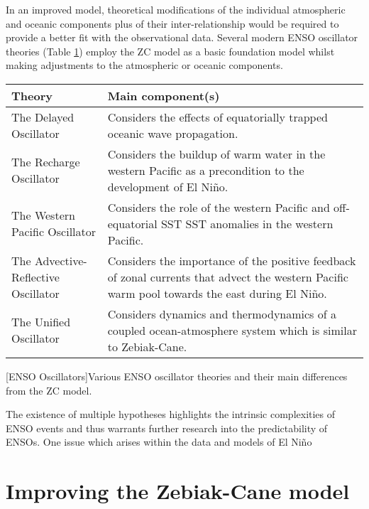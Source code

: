 \documentclass[12pt, onecolumn]{revtex4}    %
\begin{document}

In an improved model, theoretical modifications of the individual atmospheric and oceanic components plus of their inter-relationship would be required to provide a better fit with the observational data. Several modern ENSO oscillator theories (Table \ref{table:enso_oscillators}) employ the ZC model as a basic foundation model whilst making adjustments to the atmospheric or oceanic components. 

\begin{table}[htbp]
\renewcommand{\arraystretch}{1.0}
\begin{tabular}{|p{7cm}|p{9cm}|}
 \hline
 \textbf{Theory} & \textbf{Main component(s)} \\ [0.5ex] 
 \hline
 The Delayed Oscillator \citep{Suarez:1988aa, Battisti:1988aa} & Considers the effects of equatorially trapped oceanic wave propagation. \\
 \hline
 The Recharge Oscillator \citep{Jin:1997aa} & Considers the buildup of warm water in the western Pacific as a precondition to the development of El Ni\~{n}o. \\
 \hline
 The Western Pacific Oscillator \citep{Weisberg:1997aa, wang1999effects} & Considers the role of the western Pacific and off-equatorial SST SST anomalies in the western Pacific. \\
 \hline
 The Advective-Reflective Oscillator \citep{Picaut663} & Considers the importance of the positive feedback of zonal currents that advect the western Pacific warm pool towards the east during El Ni\~{n}o.  \\
 \hline
 The Unified Oscillator \citep{wang2001unified} & Considers dynamics and thermodynamics of a coupled ocean-atmosphere system which is similar to Zebiak-Cane. \\
 \hline
\end{tabular}
[ENSO Oscillators]{Various ENSO oscillator theories and their main differences from the ZC model.}
\label{table:enso_oscillators}
\end{table}

The existence of multiple hypotheses highlights the intrinsic complexities of ENSO events and thus warrants further research into the predictability of ENSOs. One issue which arises within the data and models of El Ni\~{n}o \\

\section{Improving the Zebiak-Cane model}




\newpage



\end{document}
